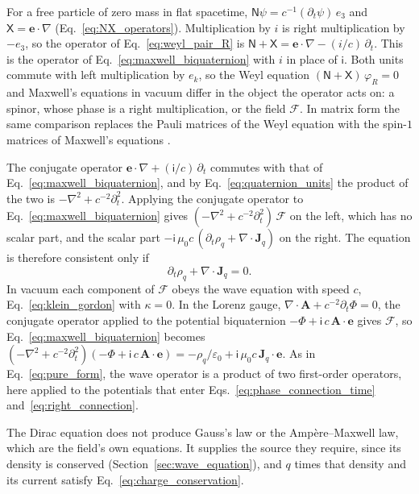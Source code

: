 \documentclass[aps,prd,onecolumn,tightenlines,nofootinbib,notitlepage,11pt,floatfix]{revtex4-2}
\theoremstyle{indentedtheorem}
\begin{document}
For a free particle of zero mass in flat spacetime, $\mathsf{N}\psi=c^{-1}(\partial_t\psi)\,e_3$ and $\mathsf{X}=\mathbf{e}\cdot\nabla$ (Eq.~\eqref{eq:NX_operators}). Multiplication by $i$ is right multiplication by $-e_3$, so the operator of Eq.~\eqref{eq:weyl_pair_R} is $\mathsf{N}+\mathsf{X}=\mathbf{e}\cdot\nabla-(i/c)\,\partial_t$. This is the operator of Eq.~\eqref{eq:maxwell_biquaternion} with $i$ in place of $\mathsf{i}$. Both units commute with left multiplication by $e_k$, so the Weyl equation $(\mathsf{N}+\mathsf{X})\,\varphi_R=0$ and Maxwell's equations in vacuum differ in the object the operator acts on: a spinor, whose phase is a right multiplication, or the field $\mathcal{F}$. In matrix form the same comparison replaces the Pauli matrices of the Weyl equation with the spin-$1$ matrices of Maxwell's equations \citep{BialynickiBirula1996Photon}.

The conjugate operator $\mathbf{e}\cdot\nabla+(\mathsf{i}/c)\,\partial_t$ commutes with that of Eq.~\eqref{eq:maxwell_biquaternion}, and by Eq.~\eqref{eq:quaternion_units} the product of the two is $-\nabla^2+c^{-2}\partial_t^2$. Applying the conjugate operator to Eq.~\eqref{eq:maxwell_biquaternion} gives $(-\nabla^2+c^{-2}\partial_t^2)\,\mathcal{F}$ on the left, which has no scalar part, and the scalar part $-\mathsf{i}\,\mu_0c\,(\partial_t\rho_q+\nabla\cdot\mathbf{J}_q)$ on the right. The equation is therefore consistent only if
\begin{equation}
    \partial_t\rho_q+\nabla\cdot\mathbf{J}_q = 0 .
    \label{eq:charge_conservation}
\end{equation}
In vacuum each component of $\mathcal{F}$ obeys the wave equation with speed $c$, Eq.~\eqref{eq:klein_gordon} with $\kappa=0$. In the Lorenz gauge, $\nabla\cdot\mathbf{A}+c^{-2}\partial_t\Phi=0$, the conjugate operator applied to the potential biquaternion $-\Phi+\mathsf{i}\,c\,\mathbf{A}\cdot\mathbf{e}$ gives $\mathcal{F}$, so Eq.~\eqref{eq:maxwell_biquaternion} becomes $(-\nabla^2+c^{-2}\partial_t^2)(-\Phi+\mathsf{i}\,c\,\mathbf{A}\cdot\mathbf{e})=-\rho_q/\varepsilon_0+\mathsf{i}\,\mu_0c\,\mathbf{J}_q\cdot\mathbf{e}$. As in Eq.~\eqref{eq:pure_form}, the wave operator is a product of two first-order operators, here applied to the potentials that enter Eqs.~\eqref{eq:phase_connection_time} and~\eqref{eq:right_connection}.

The Dirac equation does not produce Gauss's law or the Amp\`ere--Maxwell law, which are the field's own equations. It supplies the source they require, since its density is conserved (Section~\ref{sec:wave_equation}), and $q$ times that density and its current satisfy Eq.~\eqref{eq:charge_conservation}.
\end{document}
